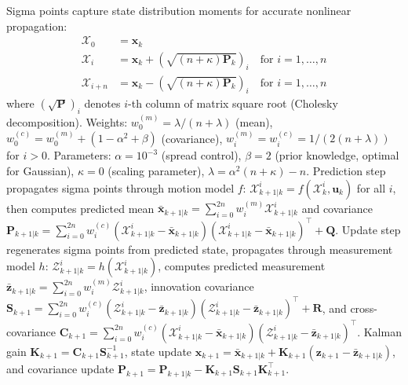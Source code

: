 \documentclass[pdflatex,sn-nature]{sn-jnl}%
\begin{document}
Sigma points capture state distribution moments for accurate nonlinear propagation:
\begin{align}
\mathcal{X}_0 &= \mathbf{x}_k \label{eq:sigma_center} \\
\mathcal{X}_i &= \mathbf{x}_k + \left(\sqrt{(n+\kappa)\mathbf{P}_k}\right)_i \quad \text{for } i=1,\ldots,n \label{eq:sigma_positive} \\
\mathcal{X}_{i+n} &= \mathbf{x}_k - \left(\sqrt{(n+\kappa)\mathbf{P}_k}\right)_i \quad \text{for } i=1,\ldots,n \label{eq:sigma_negative}
\end{align}
where $\left(\sqrt{\mathbf{P}}\right)_i$ denotes $i$-th column of matrix square root (Cholesky decomposition). Weights: $w_0^{(m)} = \lambda/(n+\lambda)$ (mean), $w_0^{(c)} = w_0^{(m)} + (1 - \alpha^2 + \beta)$ (covariance), $w_i^{(m)} = w_i^{(c)} = 1/(2(n+\lambda))$ for $i > 0$. Parameters: $\alpha = 10^{-3}$ (spread control), $\beta = 2$ (prior knowledge, optimal for Gaussian), $\kappa = 0$ (scaling parameter), $\lambda = \alpha^2(n+\kappa) - n$. Prediction step propagates sigma points through motion model $f$: $\mathcal{X}_{k+1|k}^i = f(\mathcal{X}_k^i, \mathbf{u}_k)$ for all $i$, then computes predicted mean $\bar{\mathbf{x}}_{k+1|k} = \sum_{i=0}^{2n} w_i^{(m)} \mathcal{X}_{k+1|k}^i$ and covariance $\mathbf{P}_{k+1|k} = \sum_{i=0}^{2n} w_i^{(c)} (\mathcal{X}_{k+1|k}^i - \bar{\mathbf{x}}_{k+1|k})(\mathcal{X}_{k+1|k}^i - \bar{\mathbf{x}}_{k+1|k})^\top + \mathbf{Q}$. Update step regenerates sigma points from predicted state, propagates through measurement model $h$: $\mathcal{Z}_{k+1|k}^i = h(\mathcal{X}_{k+1|k}^i)$, computes predicted measurement $\bar{\mathbf{z}}_{k+1|k} = \sum_{i=0}^{2n} w_i^{(m)} \mathcal{Z}_{k+1|k}^i$, innovation covariance $\mathbf{S}_{k+1} = \sum_{i=0}^{2n} w_i^{(c)} (\mathcal{Z}_{k+1|k}^i - \bar{\mathbf{z}}_{k+1|k})(\mathcal{Z}_{k+1|k}^i - \bar{\mathbf{z}}_{k+1|k})^\top + \mathbf{R}$, and cross-covariance $\mathbf{C}_{k+1} = \sum_{i=0}^{2n} w_i^{(c)} (\mathcal{X}_{k+1|k}^i - \bar{\mathbf{x}}_{k+1|k})(\mathcal{Z}_{k+1|k}^i - \bar{\mathbf{z}}_{k+1|k})^\top$. Kalman gain $\mathbf{K}_{k+1} = \mathbf{C}_{k+1} \mathbf{S}_{k+1}^{-1}$, state update $\mathbf{x}_{k+1} = \bar{\mathbf{x}}_{k+1|k} + \mathbf{K}_{k+1} (\mathbf{z}_{k+1} - \bar{\mathbf{z}}_{k+1|k})$, and covariance update $\mathbf{P}_{k+1} = \mathbf{P}_{k+1|k} - \mathbf{K}_{k+1} \mathbf{S}_{k+1} \mathbf{K}_{k+1}^\top$.
\end{document}
